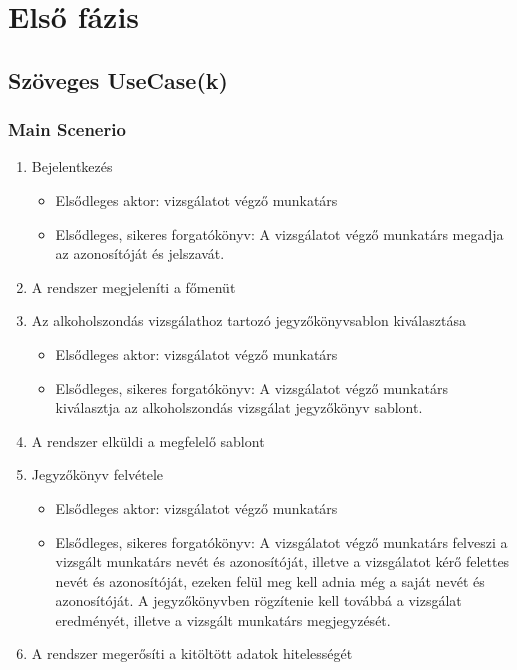 \chapter{Első fázis}\label{sect:FirstPhase}
\section{Szöveges UseCase(k)}
\subsection{Main Scenerio}
\begin{enumerate}
	\item Bejelentkezés
		\begin{itemize}
			\item Elsődleges aktor: vizsgálatot végző munkatárs
			\item Elsődleges, sikeres forgatókönyv: A vizsgálatot végző munkatárs megadja az azonosítóját és jelszavát.
		\end{itemize}	
	\item A rendszer megjeleníti a főmenüt
	\item Az alkoholszondás vizsgálathoz tartozó jegyzőkönyvsablon kiválasztása
		\begin{itemize}
			\item Elsődleges aktor: vizsgálatot végző munkatárs
			\item Elsődleges, sikeres forgatókönyv: A vizsgálatot végző munkatárs kiválasztja az alkoholszondás vizsgálat jegyzőkönyv sablont.
		\end{itemize}
	\item A rendszer elküldi a megfelelő sablont
	\item Jegyzőkönyv felvétele
		\begin{itemize}
			\item Elsődleges aktor: vizsgálatot végző munkatárs
			\item Elsődleges, sikeres forgatókönyv: A vizsgálatot végző munkatárs felveszi a vizsgált munkatárs nevét és azonosítóját, illetve a vizsgálatot kérő felettes nevét és azonosítóját, ezeken felül meg kell adnia még a saját nevét és azonosítóját. A jegyzőkönyvben rögzítenie kell továbbá a vizsgálat eredményét, illetve a vizsgált munkatárs megjegyzését. 
		\end{itemize}
	\item A rendszer megerősíti a kitöltött adatok hitelességét

\end{enumerate}
